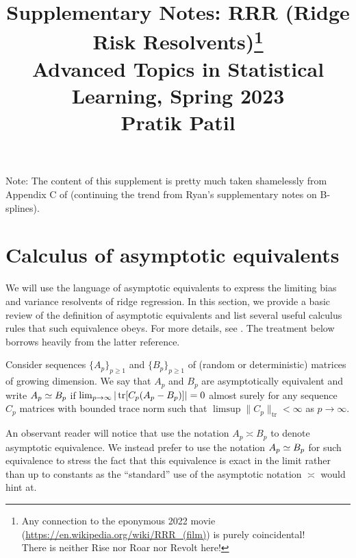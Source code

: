 \documentclass{article}
\title{Supplementary Notes: RRR (Ridge Risk Resolvents)\footnote{Any connection 
to the eponymous 2022 movie (\url{https://en.wikipedia.org/wiki/RRR_(film)}) 
is purely coincidental!\\There is neither Rise nor Roar nor Revolt here! } \\ \smallskip
\large Advanced Topics in Statistical Learning, Spring 2023 \\ \smallskip
Pratik Patil}
\author{}
\date{}
\begin{document}
\maketitle
\RaggedRight
\vspace{-25pt}

Note: The content of this supplement is pretty much taken shamelessly 
from Appendix C of \cite{patil_2022}
(continuing the trend from Ryan's supplementary notes on B-splines).

\section{Calculus of asymptotic equivalents}
\label{sec:calculus_deterministic_equivalents}

We will use the language of asymptotic equivalents
to express the limiting bias and variance resolvents of ridge regression.
In this section, we provide a basic review of the definition
of asymptotic equivalents and list several useful calculus rules
that such equivalence obeys.
For more details, see \cite{dobriban_sheng_2021, patil_2022}.
The treatment below borrows heavily from the latter reference.


\begin{definition}
    \label{def:deterministic-equivalence}
    Consider sequences $\{ A_p \}_{p \ge 1}$ and $\{ B_p \}_{p \ge 1}$
    of (random or deterministic) matrices of growing dimension.
    We say that $A_p$ and $B_p$ are asymptotically equivalent and write
    $A_p \simeq B_p$ if
    $\lim_{p \to \infty} | \operatorname{tr}[C_p (A_p - B_p)] | = 0$ almost surely
    for any sequence $C_p$ matrices with bounded trace norm
    such that $\limsup \| C_p \|_{\mathrm{tr}} < \infty$
    as $p \to \infty$.
\end{definition}

An observant reader will notice that
\cite{dobriban_sheng_2021}
use the notation $A_p \asymp B_p$
to denote asymptotic equivalence.
We instead prefer to use the notation
$A_p \simeq B_p$ for such equivalence
to stress the fact that this equivalence
is exact in the limit rather than up to constants
as the ``standard'' use of the asymptotic notation
$\asymp$ would hint at.
\end{document}
